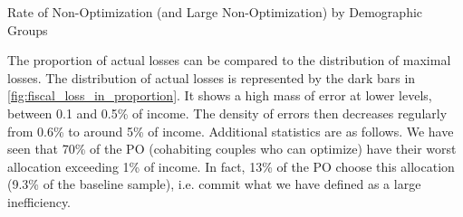   \begin{table}[H]
  \caption{Rate of Non-Optimization (and Large Non-Optimization) by Demographic Groups}
  \label{tab:table_1}
  \end{table}

The proportion of actual losses can be compared to the distribution of maximal losses. The distribution of actual losses is represented by the dark bars in \autoref{fig:fiscal_loss_in_proportion}. It shows a high mass of error at lower levels, between 0.1 and 0.5\% of income. The density of errors then decreases regularly from 0.6\% to around 5\% of income. Additional statistics are as follows. We have seen that 70\% of the PO (cohabiting couples who can optimize) have their worst allocation exceeding 1\% of income. In fact, 13\% of the PO choose this allocation (9.3\% of the baseline sample), i.e. commit what we have defined as a large inefficiency.




